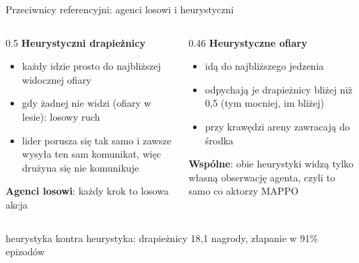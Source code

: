 \documentclass[aspectratio=169,10pt]{beamer}
\begin{document}
\begin{frame}{Przeciwnicy referencyjni: agenci losowi i heurystyczni}
  \small
  \begin{columns}[T]
    \begin{column}{0.5\textwidth}
      \textbf{Heurystyczni drapieżnicy}
      \begin{itemize}
        \item każdy idzie prosto do najbliższej widocznej ofiary
        \item gdy żadnej nie widzi (ofiary w lesie): losowy ruch
        \item lider porusza się tak samo i zawsze wysyła ten sam komunikat, więc drużyna się nie komunikuje
      \end{itemize}
      \textbf{Agenci losowi}: każdy krok to losowa akcja
    \end{column}
    \begin{column}{0.46\textwidth}
      \textbf{Heurystyczne ofiary}
      \begin{itemize}
        \item idą do najbliższego jedzenia
        \item odpychają je drapieżnicy bliżej niż 0,5 (tym mocniej, im bliżej)
        \item przy krawędzi areny zawracają do środka
      \end{itemize}
      \textbf{Wspólne}: obie heurystyki widzą tylko własną obserwację agenta, czyli to samo co aktorzy MAPPO
    \end{column}
  \end{columns}
  \vspace{6pt}
  {\small heurystyka kontra heurystyka: drapieżnicy 18,1 nagrody, złapanie w 91\% epizodów}
\end{frame}
\end{document}
